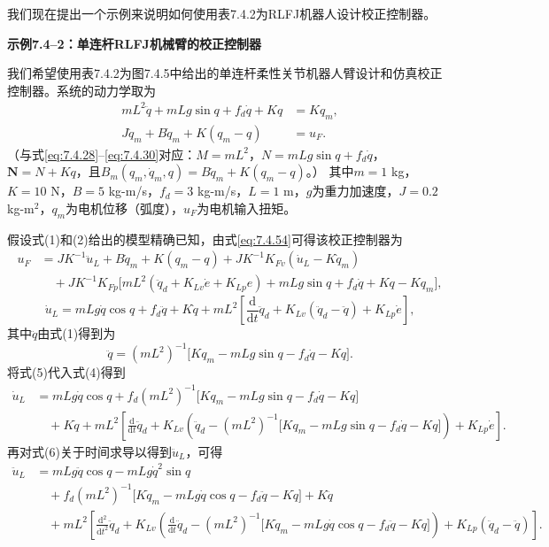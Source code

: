 \documentclass[UTF8]{ctexart}
\begin{document}
我们现在提出一个示例来说明如何使用表7.4.2为RLFJ机器人设计校正控制器。

\textbf{示例7.4--2：单连杆RLFJ机械臂的校正控制器}

我们希望使用表7.4.2为图7.4.5中给出的单连杆柔性关节机器人臂设计和仿真校正控制器。系统的动力学取为
\begin{align}
m L^2 \ddot{q} + m L g \sin q + f_d \dot{q} + K q &= K q_m, \tag{1} \\
J \ddot{q}_m + B \dot{q}_m + K(q_m - q) &= u_F. \tag{2}
\end{align}
（与式\eqref{eq:7.4.28}--\eqref{eq:7.4.30}对应：$M=mL^2$，$N=mLg\sin q+f_d\dot{q}$，$\mathbf{N}=N+Kq$，且$B_m(q_m,\dot{q}_m,q)=B\dot{q}_m+K(q_m-q)$。）
其中$m=1$ kg，$K=10$ N，$B=5$ kg-m/s，$f_d=3$ kg-m/s，$L=1$ m，$g$为重力加速度，$J=0.2$ kg-m$^2$，$q_m$为电机位移（弧度），$u_F$为电机输入扭矩。

假设式(1)和(2)给出的模型精确已知，由式\eqref{eq:7.4.54}可得该校正控制器为
\begin{equation}\tag{3}
\begin{aligned}
u_F &= J K^{-1}\ddot{u}_L + B\dot{q}_m + K(q_m-q) + J K^{-1}K_{Fv}(\dot{u}_L-K\dot{q}_m) \\
&\quad {} + J K^{-1}K_{Fp}\bigl[mL^2(\ddot{q}_d+K_{Lv}\dot{e}+K_{Lp}e)+mLg\sin q+f_d\dot{q}+Kq-Kq_m\bigr],
\end{aligned}
\end{equation}
\begin{equation}\tag{4}
\dot{u}_L = mLg\dot{q}\cos q+f_d\ddot{q}+K\dot{q}+mL^2\left[\frac{\mathrm{d}}{\mathrm{d}t}\ddot{q}_d+K_{Lv}(\ddot{q}_d-\ddot{q})+K_{Lp}\dot{e}\right],
\end{equation}
其中$\ddot{q}$由式(1)得到为
\begin{equation}\tag{5}
\ddot{q}=(mL^2)^{-1}\bigl[Kq_m-mLg\sin q-f_d\dot{q}-Kq\bigr].
\end{equation}
将式(5)代入式(4)得到
\begin{equation}\tag{6}
\begin{aligned}
\dot{u}_L &= mLg\dot{q}\cos q+f_d(mL^2)^{-1}\bigl[Kq_m-mLg\sin q-f_d\dot{q}-Kq\bigr] \\
&\quad {} +K\dot{q}+mL^2\left[\frac{\mathrm{d}}{\mathrm{d}t}\ddot{q}_d+K_{Lv}\left(\ddot{q}_d-(mL^2)^{-1}\bigl[Kq_m-mLg\sin q-f_d\dot{q}-Kq\bigr]\right)+K_{Lp}\dot{e}\right].
\end{aligned}
\end{equation}
再对式(6)关于时间求导以得到$\ddot{u}_L$，可得
\begin{equation}\tag{7}
\begin{aligned}
\ddot{u}_L &= mLg\ddot{q}\cos q-mLg\dot{q}^2\sin q \\
&\quad {} +f_d(mL^2)^{-1}\bigl[K\dot{q}_m-mLg\dot{q}\cos q-f_d\ddot{q}-K\dot{q}\bigr]+K\ddot{q} \\
&\quad {} +mL^2\left[\frac{\mathrm{d}^2}{\mathrm{d}t^2}\ddot{q}_d+K_{Lv}\left(\frac{\mathrm{d}}{\mathrm{d}t}\ddot{q}_d-(mL^2)^{-1}\bigl[K\dot{q}_m-mLg\dot{q}\cos q-f_d\ddot{q}-K\dot{q}\bigr]\right)+K_{Lp}(\ddot{q}_d-\ddot{q})\right].
\end{aligned}
\end{equation}
\end{document}
